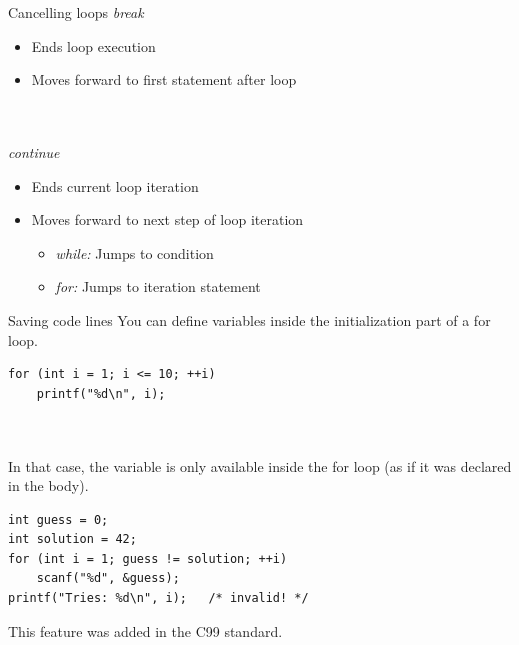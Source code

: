 \begin{frame}{Cancelling loops}
	\textit{break}
	\begin{itemize}
		\item Ends loop execution
		\item Moves forward to first statement after loop
	\end{itemize}\ \\\ \\
	\textit{continue}
	\begin{itemize}
		\item Ends current loop iteration
		\item Moves forward to next step of loop iteration
		\begin{itemize}
			\item\textit{while:} Jumps to condition
			\item\textit{for:} Jumps to iteration statement
		\end{itemize}
	\end{itemize}
\end{frame}

\begin{frame}[fragile]{Saving code lines}
	You can define variables inside the initialization part of a for loop.
	\begin{lstlisting}[numbers=none]
for (int i = 1; i <= 10; ++i)
	printf("%d\n", i);
\end{lstlisting}
	\ \\\ \\In that case, the variable is only available inside the for loop (as if it was declared in the body).\\
	\begin{lstlisting}
int guess = 0;
int solution = 42;
for (int i = 1; guess != solution; ++i)
	scanf("%d", &guess);
printf("Tries: %d\n", i);   /* invalid! */
\end{lstlisting}
	This feature was added in the C99 standard.
\end{frame}

